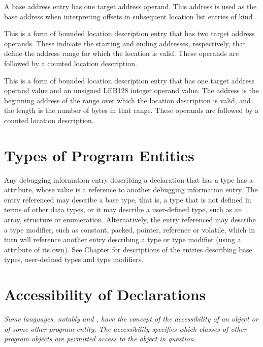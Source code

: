 \begin{enumerate}[1. ]
\addtocounter{enumi}{6}
\itembfnl{\DWLLEbaseaddressTARG}
A base address entry has one target address operand.
This address is used as the base address when interpreting
offsets in subsequent location list entries of kind
\DWLLEoffsetpair.

\itembfnl{\DWLLEstartendTARG}
This is a form of bounded location description entry that
has two target address operands. These indicate the
starting and ending addresses, respectively, that define
the address range for which the location is valid.
These operands are followed by a counted location description.
       
\itembfnl{\DWLLEstartlengthTARG}
This is a form of bounded location description entry that
has one target address operand value and an unsigned LEB128
integer operand value. The address is the beginning address
of the range over which the location description is valid, and
the length is the number of bytes in that range.
These operands are followed by a counted location description.

\end{enumerate}

\section{Types of Program Entities}
\label{chap:typesofprogramentities}
\hypertarget{chap:DWATtypetypeofdeclaration}{}
Any debugging information entry describing a declaration that
has a type has 
a \DWATtypeDEFN{} attribute, whose value is a
reference to another debugging information entry. The entry
referenced may describe a base type, that is, a type that is
not defined in terms of other data types, or it may describe a
user-defined type, such as an array, structure or enumeration.
Alternatively, the entry referenced may describe a type
modifier, such as constant, packed, pointer, reference or
volatile, which in turn will reference another entry describing
a type or type modifier (using a
\DWATtypeNAME{} attribute of its
own). See Chapter  
for descriptions of the entries describing
base types, user-defined types and type modifiers.


\section{Accessibility of Declarations}
\label{chap:accessibilityofdeclarations}
\textit{Some languages, notably  and 
, have the concept of
the accessibility of an object or of some other program
entity. The accessibility specifies which classes of other
program objects are permitted access to the object in question.}

